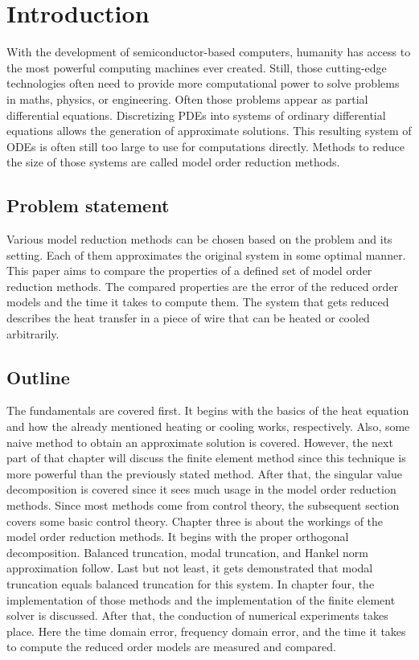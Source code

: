 \chapter{Introduction}
With the development of semiconductor-based computers, humanity has access to the most powerful computing machines ever created. Still, those cutting-edge technologies often need to provide more computational power to solve problems in maths, physics, or engineering. Often those problems appear as partial differential equations. Discretizing PDEs into systems of ordinary differential equations allows the generation of approximate solutions. This resulting system of ODEs is often still too large to use for computations directly. Methods to reduce the size of those systems are called model order reduction methods.

\section{Problem statement}
Various model reduction methods can be chosen based on the problem and its setting. Each of them approximates the original system in some optimal manner. This paper aims to compare the properties of a defined set of model order reduction methods. The compared properties are the error of the reduced order models and the time it takes to compute them. The system that gets reduced describes the heat transfer in a piece of wire that can be heated or cooled arbitrarily.

\section{Outline}
The fundamentals are covered first. It begins with the basics of the heat equation and how the already mentioned heating or cooling works, respectively. Also, some naive method to obtain an approximate solution is covered. However, the next part of that chapter will discuss the finite element method since this technique is more powerful than the previously stated method.
After that, the singular value decomposition is covered since it sees much usage in the model order reduction methods. Since most methods come from control theory, the subsequent section covers some basic control theory. Chapter three is about the workings of the model order reduction methods. It begins with the proper orthogonal decomposition. Balanced truncation, modal truncation, and Hankel norm approximation follow.
Last but not least, it gets demonstrated that modal truncation equals balanced truncation for this system. In chapter four, the implementation of those methods and the implementation of the finite element solver is discussed. After that, the conduction of numerical experiments
takes place. Here the time domain error, frequency domain error, and the time it takes to compute the reduced order models are measured and compared.